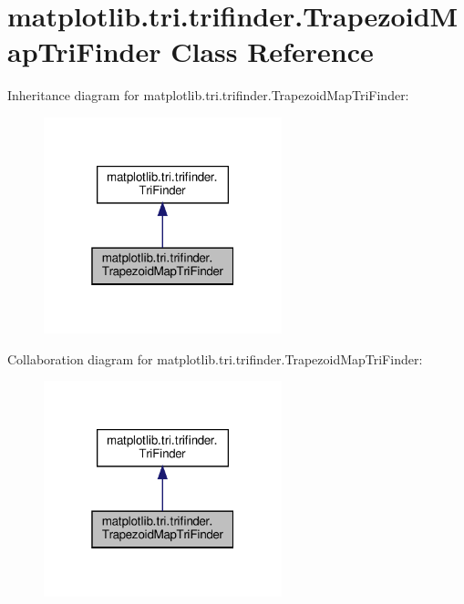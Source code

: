 \hypertarget{classmatplotlib_1_1tri_1_1trifinder_1_1TrapezoidMapTriFinder}{}\section{matplotlib.\+tri.\+trifinder.\+Trapezoid\+Map\+Tri\+Finder Class Reference}
\label{classmatplotlib_1_1tri_1_1trifinder_1_1TrapezoidMapTriFinder}


Inheritance diagram for matplotlib.\+tri.\+trifinder.\+Trapezoid\+Map\+Tri\+Finder\+:
\nopagebreak
\begin{figure}[H]
\begin{center}
\leavevmode
\includegraphics[width=196pt]{classmatplotlib_1_1tri_1_1trifinder_1_1TrapezoidMapTriFinder__inherit__graph}
\end{center}
\end{figure}


Collaboration diagram for matplotlib.\+tri.\+trifinder.\+Trapezoid\+Map\+Tri\+Finder\+:
\nopagebreak
\begin{figure}[H]
\begin{center}
\leavevmode
\includegraphics[width=196pt]{classmatplotlib_1_1tri_1_1trifinder_1_1TrapezoidMapTriFinder__coll__graph}
\end{center}
\end{figure}
